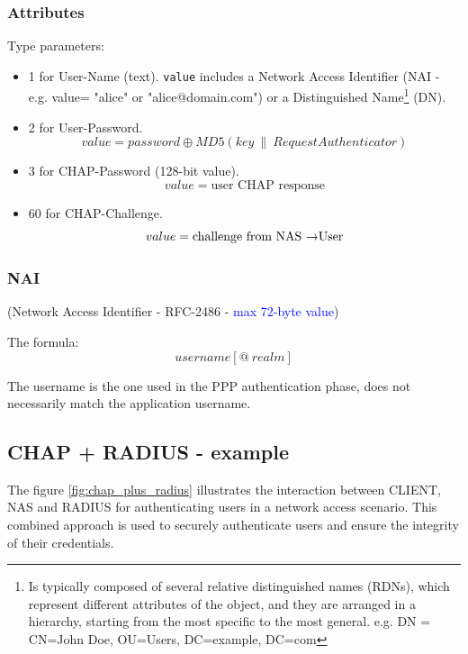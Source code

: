 \subsubsection{Attributes}
Type parameters:
\begin{itemize}
    \item 1 for User-Name (text). \texttt{value} includes a Network Access Identifier (NAI - e.g. value= "alice" or "alice@domain.com") or a Distinguished Name\footnote{Is typically composed of several relative distinguished names (RDNs), which represent different attributes of the object, and they are arranged in a hierarchy, starting from the most specific to the most general. e.g. DN = CN=John Doe, OU=Users, DC=example, DC=com} (DN).
    \item 2 for User-Password.
    \begin{equation*}
        value=password \oplus MD5(key\ \| \ RequestAuthenticator)
    \end{equation*}
    \item 3 for CHAP-Password (128-bit value).
    \begin{equation*}
        value=\text{user CHAP response}
    \end{equation*}
    \item 60 for CHAP-Challenge.
    \begin{equation*}
        value=\text{challenge from NAS \textrightarrow User}
    \end{equation*}
\end{itemize}

\subsubsection{NAI}
\begin{center}
    (Network Access Identifier - RFC-2486 - \textcolor{blue}{max 72-byte value})
\end{center}
The formula:
\begin{equation*}
    username [@ \ realm]
\end{equation*}

\hfill

\begin{tcolorbox}[colback=red!10!white, colframe=red!70!black, coltitle=white, title=Be aware] 
The username is the one used in the PPP authentication phase, does not necessarily match the application username.
\end{tcolorbox}

\subsection{CHAP + RADIUS - example}
The figure \ref{fig:chap_plus_radius} illustrates the interaction between CLIENT, NAS and RADIUS for authenticating users in a network access scenario. This combined approach is used to securely authenticate users and ensure the integrity of their credentials.


